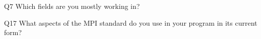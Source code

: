 \begin{description}%
\item{Q7} Which fields are you mostly working in?%
\item{Q17} What aspects of the MPI standard do you use in your program in its current form?%
\end{description}%
